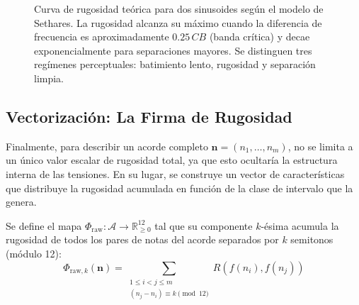 \begin{figure}[H]
\centering
{}
\caption{Curva de rugosidad teórica para dos sinusoides según el modelo de Sethares. La rugosidad alcanza su máximo cuando la diferencia de frecuencia es aproximadamente $0.25\,CB$ (banda crítica) y decae exponencialmente para separaciones mayores. Se distinguen tres regímenes perceptuales: batimiento lento, rugosidad y separación limpia.}
\label{fig:curva_rugosidad}
\end{figure}

\subsection{Vectorización: La Firma de Rugosidad}

Finalmente, para describir un acorde completo $\mathbf{n} = (n_1, \dots, n_m)$, no se limita a un único valor escalar de rugosidad total, ya que esto ocultaría la estructura interna de las tensiones. En su lugar, se construye un vector de características que distribuye la rugosidad acumulada en función de la clase de intervalo que la genera.

\begin{definition}
Se define el mapa $\Phi_{\text{raw}}: \mathcal{A} \to \mathbb{R}_{\geq 0}^{12}$ tal que su componente $k$-ésima acumula la rugosidad de todos los pares de notas del acorde separados por $k$ semitonos (módulo 12):
\begin{equation}
\Phi_{\text{raw}, k}(\mathbf{n}) = \sum_{\substack{1 \leq i < j \leq m \\ (n_j - n_i) \equiv k \pmod{12}}} R(f(n_i), f(n_j))
\end{equation}
\end{definition}

